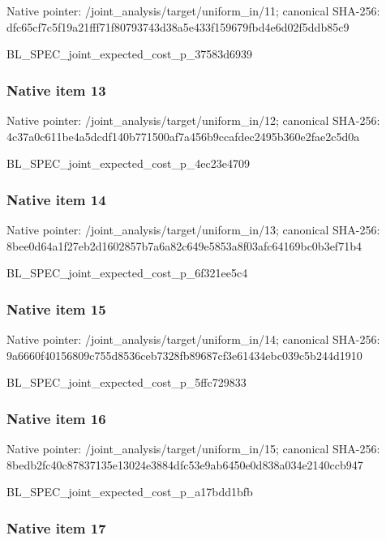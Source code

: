 \documentclass[10pt,a4paper]{article}
\begin{document}
Native pointer: /joint\_analysis/target/uniform\_in/11; canonical SHA-256: dfc65cf7c5f19a21fff71f80\allowbreak{}793743d38a5e433f159679fb\allowbreak{}d4e6d02f5ddb85c9


BL\_SPEC\_joint\_expected\_c\allowbreak{}ost\_p\_37583d6939


\subsubsection{Native item 13}


Native pointer: /joint\_analysis/target/uniform\_in/12; canonical SHA-256: 4c37a0c611be4a5dcdf140b7\allowbreak{}71500af7a456b9ccafdec249\allowbreak{}5b360e2fae2c5d0a


BL\_SPEC\_joint\_expected\_c\allowbreak{}ost\_p\_4ec23e4709


\subsubsection{Native item 14}


Native pointer: /joint\_analysis/target/uniform\_in/13; canonical SHA-256: 8bee0d64a1f27eb2d1602857\allowbreak{}b7a6a82c649e5853a8f03afc\allowbreak{}64169bc0b3ef71b4


BL\_SPEC\_joint\_expected\_c\allowbreak{}ost\_p\_6f321ee5c4


\subsubsection{Native item 15}


Native pointer: /joint\_analysis/target/uniform\_in/14; canonical SHA-256: 9a6660f40156809c755d8536\allowbreak{}ceb7328fb89687cf3e61434e\allowbreak{}bc039c5b244d1910


BL\_SPEC\_joint\_expected\_c\allowbreak{}ost\_p\_5ffc729833


\subsubsection{Native item 16}


Native pointer: /joint\_analysis/target/uniform\_in/15; canonical SHA-256: 8bedb2fc40c87837135e1302\allowbreak{}4e3884dfc53e9ab6450e0d83\allowbreak{}8a034e2140ccb947


BL\_SPEC\_joint\_expected\_c\allowbreak{}ost\_p\_a17bdd1bfb


\subsubsection{Native item 17}
\end{document}
